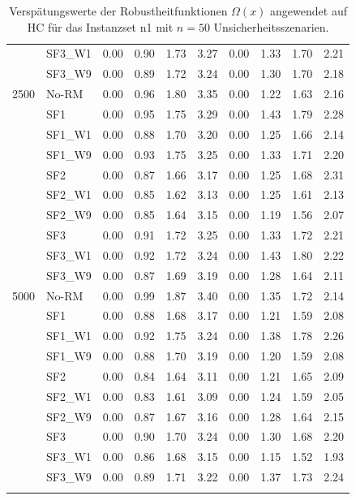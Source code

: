 {\begin{longtable}{ll|rrrr|rrrr}
     & SF3\_W1 & 0.00 & 0.90 & 1.73 & 3.27 & 0.00 & 1.33 & 1.70 & 2.21 \\
     & SF3\_W9 & 0.00 & 0.89 & 1.72 & 3.24 & 0.00 & 1.30 & 1.70 & 2.18 \\ \hline
2500 & No-RM & 0.00 & 0.96 & 1.80 & 3.35 & 0.00 & 1.22 & 1.63 & 2.16 \\
     & SF1 & 0.00 & 0.95 & 1.75 & 3.29 & 0.00 & 1.43 & 1.79 & 2.28 \\
     & SF1\_W1 & 0.00 & 0.88 & 1.70 & 3.20 & 0.00 & 1.25 & 1.66 & 2.14 \\
     & SF1\_W9 & 0.00 & 0.93 & 1.75 & 3.25 & 0.00 & 1.33 & 1.71 & 2.20 \\
     & SF2 & 0.00 & 0.87 & 1.66 & 3.17 & 0.00 & 1.25 & 1.68 & 2.31 \\
     & SF2\_W1 & 0.00 & 0.85 & 1.62 & 3.13 & 0.00 & 1.25 & 1.61 & 2.13 \\
     & SF2\_W9 & 0.00 & 0.85 & 1.64 & 3.15 & 0.00 & 1.19 & 1.56 & 2.07 \\
     & SF3 & 0.00 & 0.91 & 1.72 & 3.25 & 0.00 & 1.33 & 1.72 & 2.21 \\
     & SF3\_W1 & 0.00 & 0.92 & 1.72 & 3.24 & 0.00 & 1.43 & 1.80 & 2.22 \\
     & SF3\_W9 & 0.00 & 0.87 & 1.69 & 3.19 & 0.00 & 1.28 & 1.64 & 2.11 \\ \hline
5000 & No-RM & 0.00 & 0.99 & 1.87 & 3.40 & 0.00 & 1.35 & 1.72 & 2.14 \\
     & SF1 & 0.00 & 0.88 & 1.68 & 3.17 & 0.00 & 1.21 & 1.59 & 2.08 \\
     & SF1\_W1 & 0.00 & 0.92 & 1.75 & 3.24 & 0.00 & 1.38 & 1.78 & 2.26 \\
     & SF1\_W9 & 0.00 & 0.88 & 1.70 & 3.19 & 0.00 & 1.20 & 1.59 & 2.08 \\
     & SF2 & 0.00 & 0.84 & 1.64 & 3.11 & 0.00 & 1.21 & 1.65 & 2.09 \\
     & SF2\_W1 & 0.00 & 0.83 & 1.61 & 3.09 & 0.00 & 1.24 & 1.59 & 2.05 \\
     & SF2\_W9 & 0.00 & 0.87 & 1.67 & 3.16 & 0.00 & 1.28 & 1.64 & 2.15 \\
     & SF3 & 0.00 & 0.90 & 1.70 & 3.24 & 0.00 & 1.30 & 1.68 & 2.20 \\
     & SF3\_W1 & 0.00 & 0.86 & 1.68 & 3.15 & 0.00 & 1.15 & 1.52 & 1.93 \\
     & SF3\_W9 & 0.00 & 0.89 & 1.71 & 3.22 & 0.00 & 1.37 & 1.73 & 2.24 \\
\bottomrule
\caption{Verspätungswerte der Robustheitfunktionen $\Omega(x)$ angewendet auf HC für das Instanzset n1 mit $n = 50$ Unsicherheitsszenarien. }
\label{tab:evaluation_robustness_n1_hc}
\end{longtable}
}
\vspace*{-25px}
\begin{figure}[H]
\end{figure}

